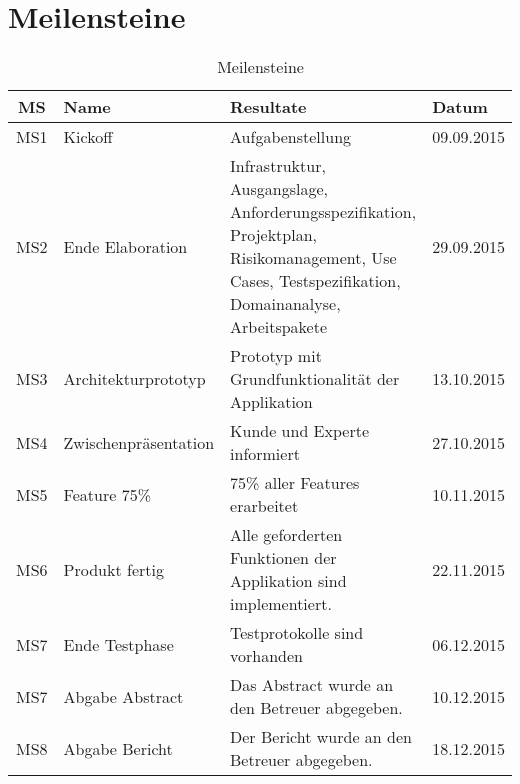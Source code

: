 
\section{Meilensteine}
\label{sec:Meilensteine}


\begin{table}[H]
\begin{tabularx}{\textwidth}{ c | l | X | l}
\textbf{MS} & \textbf{Name} & \textbf{Resultate}  & \textbf{Datum} \\ \hline
MS1 & Kickoff              & Aufgabenstellung & 09.09.2015 \\ \hline
MS2 & Ende Elaboration       & Infrastruktur, Ausgangslage, Anforderungsspezifikation, Projektplan, Risikomanagement, Use Cases, Testspezifikation, Domainanalyse, Arbeitspakete	& 29.09.2015 \\ \hline
MS3 & Architekturprototyp  & Prototyp mit Grundfunktionalität der Applikation	& 13.10.2015 \\ \hline
MS4 & Zwischenpräsentation & Kunde und Experte informiert & 27.10.2015 \\ \hline
MS5 & Feature 75\%         & 75\% aller Features erarbeitet & 10.11.2015 \\ \hline
MS6 & Produkt fertig       & Alle geforderten Funktionen der Applikation sind implementiert. & 22.11.2015 \\ \hline
MS7 & Ende Testphase       & Testprotokolle sind vorhanden & 06.12.2015 \\ \hline
MS7 & Abgabe Abstract      & Das Abstract wurde an den Betreuer abgegeben. & 10.12.2015 \\ \hline
MS8 & Abgabe Bericht       & Der Bericht wurde an den Betreuer abgegeben. & 18.12.2015 \\
\end{tabularx}
\caption{Meilensteine}
\end{table}